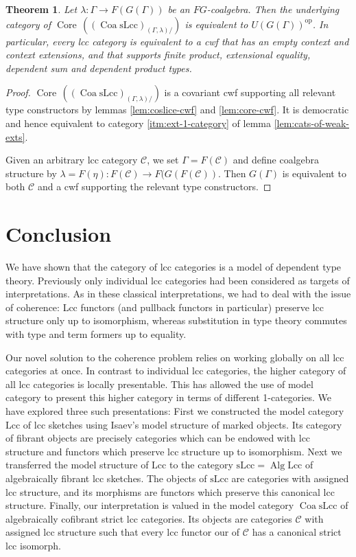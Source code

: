 \documentclass[a4paper]{article}
\newtheorem{theorem}{Theorem}
\theoremstyle{remark}
\theoremstyle{definition}
\begin{document}
\begin{theorem}
  \label{th:context-as-model}
  Let $\lambda : \Gamma \rightarrow F(G(\Gamma))$ be an $FG$-coalgebra.
  Then the underlying category of $\operatorname{Core} \, ((\operatorname{Coa} \mathrm{sLcc})_{(\Gamma, \lambda) /})$ is equivalent to $U(G(\Gamma))^\mathrm{op}$.
  In particular, every lcc category is equivalent to a cwf that has an empty context and context extensions, and that supports finite product, extensional equality, dependent sum and dependent product types.
\end{theorem}
\begin{proof}
  $\operatorname{Core} \, ((\operatorname{Coa} \mathrm{sLcc})_{(\Gamma, \lambda) /})$ is a covariant cwf supporting all relevant type constructors by lemmas \ref{lem:coslice-cwf} and \ref{lem:core-cwf}.
  It is democratic and hence equivalent to category \ref{itm:ext-1-category} of lemma \ref{lem:cats-of-weak-exts}.

  Given an arbitrary lcc category $\mathcal{C}$, we set $\Gamma = F(\mathcal{C})$ and define coalgebra structure by $\lambda = F(\eta) : F(\mathcal{C}) \rightarrow F(G(F(\mathcal{C}))$.
  Then $G(\Gamma)$ is equivalent to both $\mathcal{C}$ and a cwf supporting the relevant type constructors.
\end{proof}

\section{Conclusion}

We have shown that the category of lcc categories is a model of dependent type theory.
Previously only individual lcc categories had been considered as targets of interpretations.
As in these classical interpretations, we had to deal with the issue of coherence:
Lcc functors (and pullback functors in particular) preserve lcc structure only up to isomorphism, whereas substitution in type theory commutes with type and term formers up to equality.

Our novel solution to the coherence problem relies on working globally on all lcc categories at once.
In contrast to individual lcc categories, the higher category of all lcc categories is locally presentable.
This has allowed the use of model category to present this higher category in terms of different 1-categories.
We have explored three such presentations:
First we constructed the model category $\mathrm{Lcc}$ of lcc sketches using Isaev's model structure of marked objects.
Its category of fibrant objects are precisely categories which can be endowed with lcc structure and functors which preserve lcc structure up to isomorphism.
Next we transferred the model structure of $\mathrm{Lcc}$ to the category $\mathrm{sLcc} = \operatorname{Alg} \mathrm{Lcc}$ of algebraically fibrant lcc sketches.
The objects of $\mathrm{sLcc}$ are categories with assigned lcc structure, and its morphisms are functors which preserve this canonical lcc structure.
Finally, our interpretation is valued in the model category $\operatorname{Coa} \mathrm{sLcc}$ of algebraically cofibrant strict lcc categories.
Its objects are categories $\mathcal{C}$ with assigned lcc structure such that every lcc functor our of $\mathcal{C}$ has a canonical strict lcc isomorph.
\end{document}
